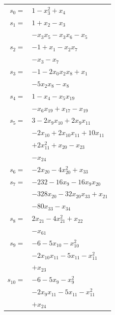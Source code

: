 \begingroup
\small
\setlength{\tabcolsep}{2pt}
\setlength{\LTleft}{0pt}
\begin{longtable}{@{}r@{\;}l@{}}
\(s_{0}=\) & \(\displaystyle 1 -x_{3}^{2} +x_{4}\) \\[3pt]
\(s_{1}=\) & \(\displaystyle 1 +x_{2} -x_{3}\) \\
 & \(\displaystyle -x_{3}x_{5} -x_{3}x_{6} -x_{5}\) \\[3pt]
\(s_{2}=\) & \(\displaystyle -1 +x_{1} -x_{2}x_{7}\) \\
 & \(\displaystyle -x_{3} -x_{7}\) \\[3pt]
\(s_{3}=\) & \(\displaystyle -1 -2x_{0}x_{2}x_{8} +x_{1}\) \\
 & \(\displaystyle -5x_{2}x_{8} -x_{8}\) \\[3pt]
\(s_{4}=\) & \(\displaystyle 1 -x_{4} -x_{5}x_{19}\) \\
 & \(\displaystyle -x_{6}x_{19} +x_{17} -x_{19}\) \\[3pt]
\(s_{5}=\) & \(\displaystyle 3 -2x_{9}x_{10} +2x_{9}x_{11}\) \\
 & \(\displaystyle -2x_{10} +2x_{10}x_{11} +10x_{11}\) \\
 & \(\displaystyle +2x_{11}^{2} +x_{20} -x_{23}\) \\
 & \(\displaystyle -x_{24}\) \\[3pt]
\(s_{6}=\) & \(\displaystyle -2x_{20} -4x_{20}^{2} +x_{33}\) \\[3pt]
\(s_{7}=\) & \(\displaystyle -232 -16x_{9} -16x_{9}x_{20}\) \\
 & \(\displaystyle -328x_{20} -32x_{20}x_{33} +x_{21}\) \\
 & \(\displaystyle -80x_{33} -x_{34}\) \\[3pt]
\(s_{8}=\) & \(\displaystyle 2x_{21} -4x_{21}^{2} +x_{22}\) \\
 & \(\displaystyle -x_{61}\) \\[3pt]
\(s_{9}=\) & \(\displaystyle -6 -5x_{10} -x_{10}^{2}\) \\
 & \(\displaystyle -2x_{10}x_{11} -5x_{11} -x_{11}^{2}\) \\
 & \(\displaystyle +x_{23}\) \\[3pt]
\(s_{10}=\) & \(\displaystyle -6 -5x_{9} -x_{9}^{2}\) \\
 & \(\displaystyle -2x_{9}x_{11} -5x_{11} -x_{11}^{2}\) \\
 & \(\displaystyle +x_{24}\) \\[3pt]

\end{longtable}
